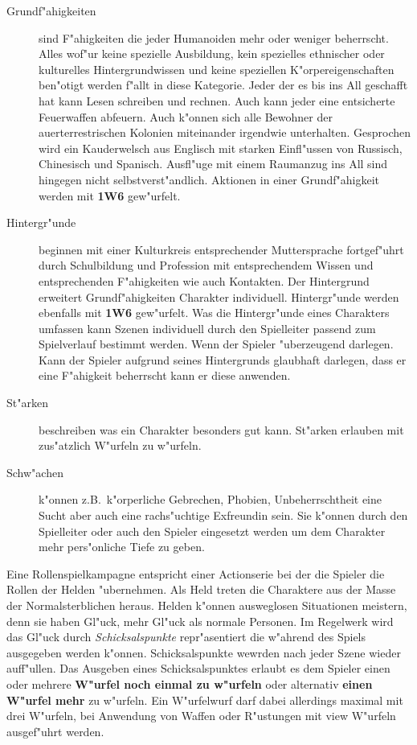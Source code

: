 \begin{description}
    \item[Grundf"ahigkeiten] sind F"ahigkeiten die jeder Humanoiden mehr oder weniger beherrscht. Alles wof"ur keine spezielle Ausbildung,  
        kein spezielles ethnischer oder kulturelles Hintergrundwissen und keine speziellen K"orpereigenschaften ben"otigt werden f"allt in diese Kategorie. Jeder der es bis ins All geschafft hat kann Lesen schreiben und rechnen. Auch kann jeder eine entsicherte Feuerwaffen abfeuern. Auch k"onnen sich alle Bewohner der au\3erterrestrischen Kolonien miteinander irgendwie unterhalten. Gesprochen wird ein Kauderwelsch aus Englisch mit starken Einfl"ussen von Russisch, Chinesisch und Spanisch. Ausfl"uge mit einem Raumanzug ins All sind hingegen nicht selbstverst"andlich.  Aktionen in einer Grundf"ahigkeit werden mit \textbf{1W6} gew"urfelt. 
    \item[Hintergr"unde] beginnen mit einer Kulturkreis entsprechender Muttersprache fortgef"uhrt durch Schulbildung und Profession mit 
        entsprechendem Wissen und entsprechenden F"ahigkeiten wie auch Kontakten. Der Hintergrund erweitert Grundf"ahigkeiten Charakter individuell. Hintergr"unde werden ebenfalls mit \textbf{1W6} gew"urfelt. Was die Hintergr"unde eines Charakters umfassen kann Szenen individuell durch den Spielleiter passend zum Spielverlauf bestimmt werden. Wenn der Spieler "uberzeugend darlegen. Kann der Spieler aufgrund seines Hintergrunds glaubhaft darlegen, dass er eine F"ahigkeit beherrscht kann er diese anwenden.
    \item[St"arken] beschreiben was ein Charakter besonders gut kann. St"arken erlauben mit zus"atzlich W"urfeln zu w"urfeln. 
    \item[Schw"achen] k"onnen z.B.~k"orperliche Gebrechen, Phobien, Unbeherrschtheit eine Sucht aber auch eine rachs"uchtige Exfreundin     
        sein. Sie k"onnen durch den Spielleiter oder auch den Spieler eingesetzt werden um dem Charakter mehr pers"onliche Tiefe zu geben.
\end{description}        


Eine Rollenspielkampagne entspricht einer Actionserie bei der die Spieler die Rollen der Helden "ubernehmen. Als Held treten die Charaktere aus der Masse der Normalsterblichen heraus. Helden k"onnen ausweglosen Situationen meistern, denn sie haben Gl"uck, mehr Gl"uck als normale Personen. Im Regelwerk wird das Gl"uck durch \emph{Schicksalspunkte} repr"asentiert die w"ahrend des Spiels ausgegeben werden k"onnen. Schicksalspunkte wewrden nach jeder Szene wieder auff"ullen. Das Ausgeben eines Schicksalspunktes erlaubt es dem Spieler einen oder mehrere \textbf{W"urfel noch einmal zu w"urfeln} oder alternativ \textbf{einen W"urfel mehr} zu w"urfeln. Ein W"urfelwurf darf dabei allerdings maximal mit drei W"urfeln, bei Anwendung von Waffen oder R"ustungen mit view W"urfeln ausgef"uhrt werden.

